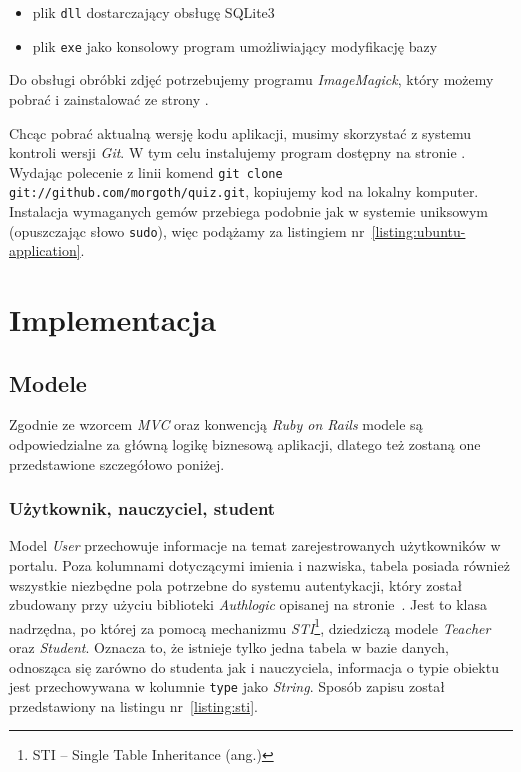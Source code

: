 \documentclass[12pt,twoside]{report}
\begin{document}
\begin{itemize}
  \item{plik \texttt{dll} dostarczający obsługę SQLite3}
  \item{plik \texttt{exe} jako konsolowy program umożliwiający modyfikację bazy}
\end{itemize}


Do obsługi obróbki zdjęć potrzebujemy programu \emph{ImageMagick}, który możemy pobrać i
zainstalować ze strony \cite{imagemagick-windows}.


Chcąc pobrać aktualną wersję kodu aplikacji, musimy skorzystać z systemu kontroli wersji
\emph{Git}. W tym celu instalujemy program dostępny na stronie \cite{git-windows}.
Wydając polecenie z linii komend \texttt{git~clone git://github.com/morgoth/quiz.git},
kopiujemy kod na lokalny komputer. Instalacja wymaganych gemów przebiega podobnie jak w
systemie uniksowym (opuszczając słowo \texttt{sudo}), więc podążamy za listingiem
nr~\ref{listing:ubuntu-application}.


\cleardoublepage
\chapter{Implementacja}
\section{Modele}
Zgodnie ze wzorcem \emph{MVC} oraz konwencją \emph{Ruby on Rails} modele są odpowiedzialne
za główną logikę biznesową aplikacji, dlatego też zostaną one przedstawione szczegółowo poniżej.

\subsection{Użytkownik, nauczyciel, student}
Model \emph{User} przechowuje informacje na temat zarejestrowanych użytkowników w
portalu. Poza kolumnami dotyczącymi imienia i nazwiska, tabela posiada również wszystkie
niezbędne pola potrzebne do systemu autentykacji, który został zbudowany przy użyciu
biblioteki \emph{Authlogic} opisanej na stronie~\pageref{sec:authlogic}. Jest to klasa
nadrzędna, po której za pomocą mechanizmu \emph{STI}\footnote{STI -- Single Table
Inheritance (ang.)}, dziedziczą modele \emph{Teacher} oraz \emph{Student}. Oznacza to, że
istnieje tylko jedna tabela w bazie danych, odnosząca się zarówno do studenta jak i
nauczyciela, informacja o typie obiektu jest przechowywana w kolumnie \texttt{type} jako
\emph{String}. Sposób zapisu został przedstawiony na listingu nr~\ref{listing:sti}.
\end{document}
